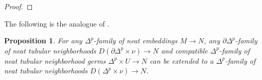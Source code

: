 \documentclass[11pt]{amsart}
\newtheorem{prop}{Proposition}[section]
\theoremstyle{definition}
\numberwithin{equation}{section}
\numberwithin{figure}{section}
\newcommand{\NTub}{\textup{NTub}}
\newcommand{\sbt}{\,\begin{picture}(-1,1)(0.5,-1)\circle*{1.8}\end{picture}\hspace{.05cm}}
\begin{document}
\begin{proof}
%
%
%
%
%
\end{proof}

The following is the analogue of \cite[Prop 2.43]{GIMM1}.

\begin{prop}\label{ntn_step2}
	For any $\Delta^p$-family of neat embeddings $M \to N$, any $\partial \Delta^p$-family of neat tubular neighborhoods $D(\partial \Delta^p \times \nu) \to N$ and compatible $\Delta^p$-family of neat tubular neighborhood germs $\Delta^p \times U \to N$ can be extended to a $\Delta^p$-family of neat tubular neighborhoods $D(\Delta^p \times \nu) \to N$.
\end{prop}
\end{document}
